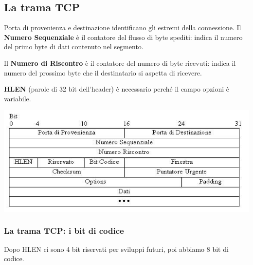     \subsection{La trama TCP}
        Porta di provenienza e destinazione identificano gli estremi della connessione. Il \textbf{Numero Sequenziale} è il contatore del flusso di byte spediti: indica il numero del primo byte di dati contenuto nel segmento.
    
        Il \textbf{Numero di Riscontro} è il contatore del numero di byte ricevuti: indica il numero del prossimo byte che il destinatario si aspetta di ricevere.
    
        \textbf{HLEN} (parole di 32 bit dell'header) è necessario perché il campo opzioni è variabile.

        \begin{center}
            \includegraphics[scale=0.43]{chapters/5/assets/schema_k.png}
        \end{center}

        \subsubsection{La trama TCP: i bit di codice}
            Dopo HLEN ci sono 4 bit riservati per sviluppi futuri, poi abbiamo 8 bit di codice.
        

